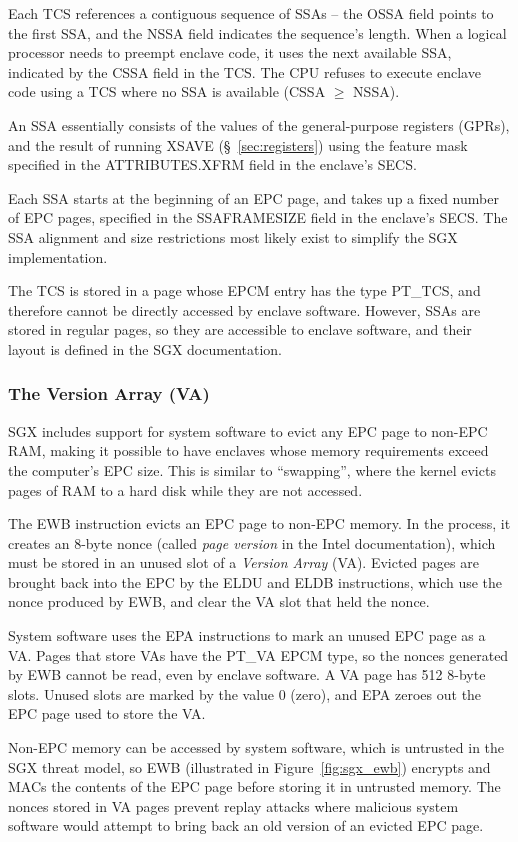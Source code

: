 Each TCS references a contiguous sequence of SSAs -- the OSSA field points to
the first SSA, and the NSSA field indicates the sequence's length. When a
logical processor needs to preempt enclave code, it uses the next available
SSA, indicated by the CSSA field in the TCS. The CPU refuses to execute enclave
code using a TCS where no SSA is available (CSSA $\ge$ NSSA).

An SSA essentially consists of the values of the general-purpose registers
(GPRs), and the result of running XSAVE (\S~\ref{sec:registers}) using the
feature mask specified in the ATTRIBUTES.XFRM field in the enclave's SECS.


Each SSA starts at the beginning of an EPC page, and takes up a fixed number of
EPC pages, specified in the SSAFRAMESIZE field in the enclave's SECS. The SSA
alignment and size restrictions most likely exist to simplify the SGX
implementation.

The TCS is stored in a page whose EPCM entry has the type PT\_TCS, and
therefore cannot be directly accessed by enclave software. However, SSAs are
stored in regular pages, so they are accessible to enclave software, and their
layout is defined in the SGX documentation.

\subsubsection{The Version Array (VA)}
\label{sec:va}

SGX includes support for system software to evict any EPC page to non-EPC RAM,
making it possible to have enclaves whose memory requirements exceed the
computer's EPC size. This is similar to ``swapping'', where the kernel evicts
pages of RAM to a hard disk while they are not accessed.


The EWB instruction evicts an EPC page to non-EPC memory. In the process, it
creates an 8-byte nonce (called \textit{page version} in the Intel
documentation), which must be stored in an unused slot of a \textit{Version
Array} (VA). Evicted pages are brought back into the EPC by the ELDU and ELDB
instructions, which use the nonce produced by EWB, and clear the VA slot that
held the nonce.

System software uses the EPA instructions to mark an unused EPC page as a VA.
Pages that store VAs have the PT\_VA EPCM type, so the nonces generated by EWB
cannot be read, even by enclave software.  A VA page has 512 8-byte slots.
Unused slots are marked by the value 0 (zero), and EPA zeroes out the EPC page
used to store the VA.

Non-EPC memory can be accessed by system software, which is untrusted in the
SGX threat model, so EWB (illustrated in Figure~\ref{fig:sgx_ewb}) encrypts and
MACs the contents of the EPC page before storing it in untrusted memory. The
nonces stored in VA pages prevent replay attacks where malicious system
software would attempt to bring back an old version of an evicted EPC page.
